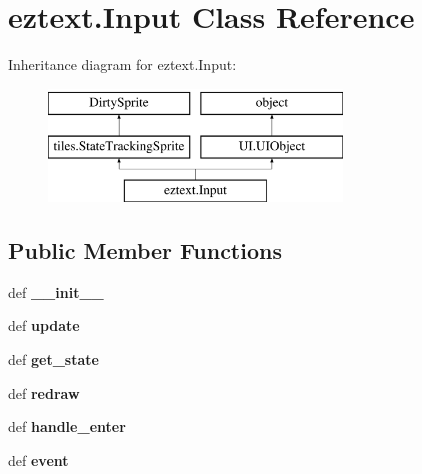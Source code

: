 \hypertarget{classeztext_1_1Input}{\section{eztext.\-Input Class Reference}
\label{classeztext_1_1Input}
}
Inheritance diagram for eztext.\-Input\-:\begin{figure}[H]
\begin{center}
\leavevmode
\includegraphics[height=3.000000cm]{classeztext_1_1Input}
\end{center}
\end{figure}
\subsection*{Public Member Functions}
\begin{DoxyCompactItemize}
\item 
\hypertarget{classeztext_1_1Input_a3e4f9ae6a767fd8cabe470eba31431e7}{def {\bfseries \-\_\-\-\_\-init\-\_\-\-\_\-}}\label{classeztext_1_1Input_a3e4f9ae6a767fd8cabe470eba31431e7}

\item 
\hypertarget{classeztext_1_1Input_ab8d9eb19fff57335c873adf583dae14b}{def {\bfseries update}}\label{classeztext_1_1Input_ab8d9eb19fff57335c873adf583dae14b}

\item 
\hypertarget{classeztext_1_1Input_aadb9583d8c4207e0232a55d8f44c3c22}{def {\bfseries get\-\_\-state}}\label{classeztext_1_1Input_aadb9583d8c4207e0232a55d8f44c3c22}

\item 
\hypertarget{classeztext_1_1Input_a11a8ed1c86037342050eb8a6aff76c5a}{def {\bfseries redraw}}\label{classeztext_1_1Input_a11a8ed1c86037342050eb8a6aff76c5a}

\item 
\hypertarget{classeztext_1_1Input_aaf96f3b24e705d78ddf0f31867998b49}{def {\bfseries handle\-\_\-enter}}\label{classeztext_1_1Input_aaf96f3b24e705d78ddf0f31867998b49}

\item 
\hypertarget{classeztext_1_1Input_a6ca19e326623a9fa5072c37fe501bccf}{def {\bfseries event}}\label{classeztext_1_1Input_a6ca19e326623a9fa5072c37fe501bccf}

\end{DoxyCompactItemize}
